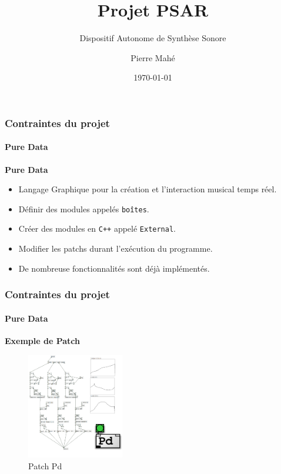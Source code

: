\documentclass{beamer}
\title{Projet PSAR}
\subtitle{Dispositif Autonome de Synthèse Sonore}
\institute{Encadrant : Hugues Genevois}
\author{Pierre Mahé}
\date{\today}
\begin{document}
\begin{frame}
\titlepage
\end{frame}

\begin{frame}
\frametitle{Contraintes du projet}
\framesubtitle{Pure Data}
\textbf{Pure Data}
\begin{itemize}
\item Langage Graphique pour la création et l'interaction musical temps réel.
\item Définir des modules appelés \texttt{boîtes}.
\item Créer des modules en \texttt{C++} appelé \texttt{External}.
\item Modifier les patchs durant l’exécution du programme.
\item De nombreuse fonctionnalités sont déjà implémentés.
\end{itemize}
\end{frame}

\begin{frame}
\frametitle{Contraintes du projet}
\framesubtitle{Pure Data}
\textbf{Exemple de Patch}
\begin{figure}
  \centering
  \includegraphics[width=160px]{pd.jpg} 
	\caption{Patch Pd}
\end{figure}
\end{frame}
\end{document}
